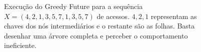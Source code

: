 \begin{figure}
    \caption{Execução do Greedy Future para a sequência $X = (4,2,1,3,5,7,1,3,5,7)$ de acessos. $4,2,1$ representam as chaves dos nós intermediários e o restante são as folhas. Basta desenhar uma árvore completa e perceber o comportamento ineficiente.}
\label{fig:GreedyFuture-bit-reversal}
\end{figure}